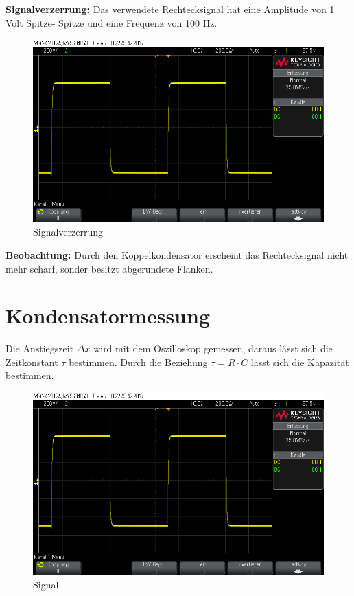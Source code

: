 \documentclass[10pt]{report}
\begin{document}
         \noindent \textbf{Signalverzerrung:} Das verwendete Rechtecksignal hat eine Amplitude von 1 Volt Spitze-
         Spitze und eine Frequenz von 100 Hz.
         \begin{figure}[H]
          \includegraphics[width=\textwidth]{scope_1.png}
          \caption{Signalverzerrung}
        \end{figure}

         \noindent \textbf{Beobachtung:} Durch den Koppelkondensator erscheint
         das Rechtecksignal nicht mehr scharf,
         sonder besitzt abgerundete Flanken.

         \section{Kondensatormessung}
         Die Anstiegszeit $\Delta x$ wird mit dem Oszilloskop gemessen,
         daraus lässt sich die Zeitkonstant $\tau$ bestimmen. Durch
         die Beziehung $\tau = R \cdot C$ lässt sich die Kapazität
         bestimmen.
         \begin{figure}[H]
          \includegraphics[width=\textwidth]{scope_1.png}
          \caption{Signal}
        \end{figure}
\end{document}
